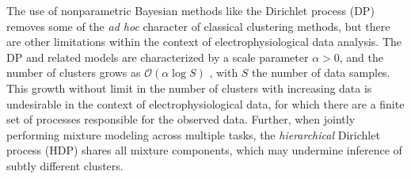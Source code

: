 \documentclass[journal]{IEEEtran}
\begin{document}
The use of nonparametric Bayesian methods like the Dirichlet process (DP) \cite{Wood2009,Bo2011} removes some of the \emph{ad hoc} character of classical clustering methods, but there are other limitations within the context of electrophysiological data analysis. The DP and related models are characterized by a scale parameter $\alpha>0$, and the number of clusters grows as $\mathcal{O}(\alpha \log S)$ \cite{Teh2010a}, with $S$ the number of data samples. This growth without limit in the number of clusters with increasing data is undesirable in the context of electrophysiological data, for which there are a finite set of processes responsible for the observed data. Further, when jointly performing mixture modeling across multiple tasks, the \emph{hierarchical} Dirichlet process (HDP) \cite{HDP} shares all mixture components, which may undermine inference of subtly different clusters.
\end{document}
